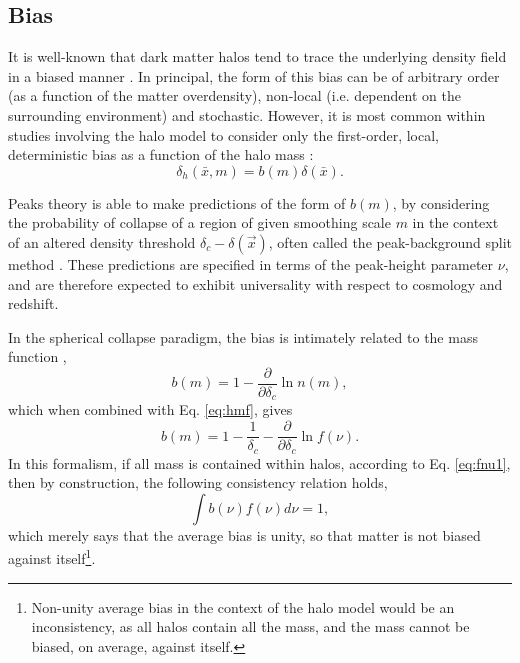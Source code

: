 \documentclass[5p,aas_macros]{elsarticle}
\begin{document}
\subsection{Bias}
\label{sec:biastheory}
It is well-known that dark matter halos tend to trace the underlying density field in a biased manner \citep[eg.]{Cole1989}. In principal, the form of this bias can be of arbitrary order (as a function of the matter overdensity), non-local (i.e. dependent on the surrounding environment) and stochastic. However, it is most common within studies involving the halo model to consider only the first-order, local, deterministic bias as a function of the halo mass \citep{Mo1996}: 
\begin{equation}
    \delta_h(\bar{x},m) = b(m) \delta(\bar{x}).
\end{equation}

Peaks theory is able to make predictions of the form of $b(m)$, by considering the probability of collapse of a region of given smoothing scale $m$ in the context of an altered density threshold $\delta_c - \delta(\vec{x})$, often called the peak-background split method \citep[for more details, see eg.][]{Bond1991,Zentner2007,Tinker2010,Manera2010}. These predictions are specified in terms of the peak-height parameter $\nu$, and are therefore expected to exhibit universality with respect to cosmology and redshift.

In the spherical collapse paradigm, the bias is intimately related to the mass function \citep{Cole1989,Cooray2002}, 
\begin{equation}
    b(m) = 1 - \frac{\partial}{\partial \delta_c} \ln n(m),
\end{equation}
which when combined with Eq. \ref{eq:hmf}, gives
\begin{equation}
    b(m) = 1 - \frac{1}{\delta_c} - \frac{\partial}{\partial \delta_c} \ln f(\nu).
\end{equation}
In this formalism, if all mass is contained within halos, according to Eq. \ref{eq:fnu1}, then by construction, the following consistency relation holds,
\begin{equation}
\label{eq:consistency}
    \int b(\nu) f(\nu) d\nu = 1, 
\end{equation}
which merely says that the average bias is unity, so that matter is not biased against itself\footnote{Non-unity average bias in the context of the halo model would be an inconsistency, as all halos contain all the mass, and the mass cannot be biased, on average, against itself.}. 
\end{document}
